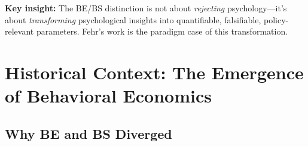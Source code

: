 \documentclass[11pt, a4paper]{article}
\begin{document}
\textbf{Key insight:} The BE/BS distinction is not about \textit{rejecting} psychology---it's about \textit{transforming} psychological insights into quantifiable, falsifiable, policy-relevant parameters. Fehr's work is the paradigm case of this transformation.


\section{Historical Context: The Emergence of Behavioral Economics}
\label{sec:evd-history}

\subsection{Why BE and BS Diverged}
\end{document}

